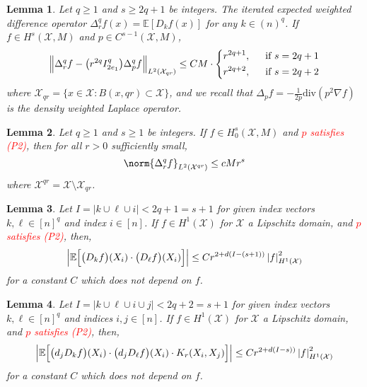 \documentclass{article}
\newcommand{\abs}[1]{\left \lvert #1 \right \rvert}
\newcommand{\1}{\mathbf{1}}
\newcommand{\Xset}{\mathcal{X}}
\newcommand{\Leb}{L}
\newcommand{\Ebb}{\mathbb{E}}
\theoremstyle{alden}
\theoremstyle{aldenthm}
\newtheorem{lemma}{Lemma}
\theoremstyle{definition}
\theoremstyle{remark}
\begin{document}
\begin{lemma}
	\label{lem:expected_difference_sobolev}
	Let $q \geq 1$ and $s \geq 2q + 1$ be integers. The iterated expected weighted difference operator  $\Delta_r^qf(x) = \Ebb[D_kf(x)]$ for any $k \in (n)^q$. If $f \in H^s(\Xset,M)$ and $p \in C^{s-1}(\Xset,M)$,
	\begin{equation*}
	\Bigl\|\Delta_r^qf - \bigl(r^{2q} I_{2e_1}^{q}\bigr) \Delta_{p}^qf\Bigr\|_{\Leb^2(\Xset_{qr})} \leq CM \cdot
	\begin{dcases}
	r^{2q + 1},& ~~\textrm{if $s = 2q + 1$} \\
	r^{2q + 2},& ~~\textrm{if $s = 2q + 2$}
	\end{dcases}
	\end{equation*}
	where $\Xset_{qr} = \{x \in \Xset: B(x,qr) \subset \Xset\}$, and we recall that $\Delta_pf = -\frac{1}{2p}\mathrm{div}(p^2 \nabla f)$ is the density weighted Laplace operator.
\end{lemma}
\begin{lemma}
	\label{lem:expected_difference_boundary}
	Let $q \geq 1$ and $s \geq 1$ be integers. If $f \in H_0^s(\Xset,M)$ and \textcolor{red}{$p$ satisfies (P2)}, then for all $r > 0$ sufficiently small,
	\begin{equation*}
	\norm{\Delta_r^qf}_{\Leb^2(\Xset^{qr})} \leq cMr^s
	\end{equation*}
	where $\Xset^{qr} = \Xset \setminus \Xset_{qr}$.
\end{lemma}
\begin{lemma}
	\label{lem:expected_difference_lower_order_1}
	Let $I = \abs{k \cup \ell \cup i} < 2q + 1 = s + 1$ for given index vectors $k,\ell \in [n]^q$ and index $i \in [n]$. If $f \in H^1(\Xset)$ for $\Xset$ a Lipschitz domain, and \textcolor{red}{$p$ satisfies (P2)}, then, 
	\begin{equation*}
	\Bigl|\Ebb\Bigl[\bigl(D_kf\bigr)(X_i) \cdot \bigl(D_{\ell}f\bigr)(X_i)\Bigr]\Bigr| \leq C r^{2 + d(I - (s + 1))} \abs{f}_{H^1(\Xset)}^2
	\end{equation*}
	for a constant $C$ which does not depend on $f$.
\end{lemma}
\begin{lemma}
	\label{lem:expected_difference_lower_order_2}
	Let $I = \abs{k \cup \ell \cup i \cup j} < 2q + 2 = s + 1$ for given index vectors $k,\ell \in [n]^q$ and indices $i,j \in [n]$. If $f \in H^1(\Xset)$ for $\Xset$ a Lipschitz domain, and \textcolor{red}{$p$ satisfies (P2)}, then, 
	\begin{equation*}
	\Bigl|\Ebb\Bigl[\bigl(d_jD_kf\bigr)(X_i) \cdot \bigl(d_jD_{\ell}f\bigr)(X_i) \cdot K_r(X_i,X_j)\Bigr]\Bigr| \leq C r^{2 + d(I - s))} \abs{f}_{H^1(\Xset)}^2
	\end{equation*}
	for a constant $C$ which does not depend on $f$.
\end{lemma}
\end{document}
